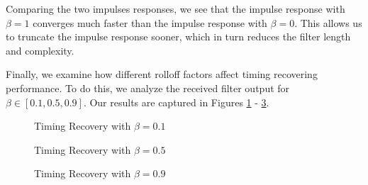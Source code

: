 \documentclass{article}
\begin{document}
\noindent Comparing the two impulses responses, we see that the impulse response with $\beta=1$ converges much faster than the impulse response with $\beta=0$. This allows us to truncate the impulse response sooner, which in turn reduces the filter length and complexity.

Finally, we examine how different rolloff factors affect timing recovering performance. To do this, we analyze the received filter output for $\beta \in [0.1, 0.5, 0.9]$. Our results are captured in Figures \ref{fig::timing_recovery_beta_0_1} - \ref{fig::timing_recovery_beta_0_9}.

\begin{figure}[H]
	\centerline{}
	\caption{Timing Recovery with $\beta=0.1$}
	\label{fig::timing_recovery_beta_0_1}
\end{figure}

\begin{figure}[H]
	\centerline{}
	\caption{Timing Recovery with $\beta=0.5$}
	\label{fig::timing_recovery_beta_0_5}
\end{figure}

\begin{figure}[H]
	\centerline{}
	\caption{Timing Recovery with $\beta=0.9$}
	\label{fig::timing_recovery_beta_0_9}
\end{figure}
\end{document}
